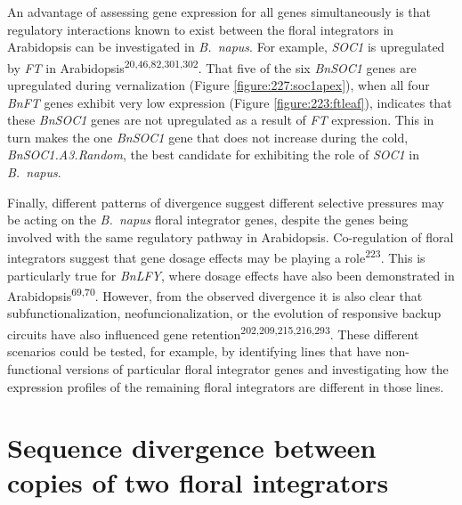 \documentclass[12pt,]{book}
\begin{document}
An advantage of assessing gene expression for all genes simultaneously
is that regulatory interactions known to exist between the floral
integrators in Arabidopsis can be investigated in \emph{B.~napus}. For
example, \emph{SOC1} is upregulated by \emph{FT} in
Arabidopsis\textsuperscript{20,46,82,301,302}. That five of the six
\emph{BnSOC1} genes are upregulated during vernalization (Figure
\ref{figure:227:soc1apex}), when all four \emph{BnFT} genes exhibit very
low expression (Figure \ref{figure:223:ftleaf}), indicates that these
\emph{BnSOC1} genes are not upregulated as a result of \emph{FT}
expression. This in turn makes the one \emph{BnSOC1} gene that does not
increase during the cold, \emph{BnSOC1.A3.Random}, the best candidate
for exhibiting the role of \emph{SOC1} in \emph{B.~napus}.

Finally, different patterns of divergence suggest different selective
pressures may be acting on the \emph{B.~napus} floral integrator genes,
despite the genes being involved with the same regulatory pathway in
Arabidopsis. Co-regulation of floral integrators suggest that gene
dosage effects may be playing a role\textsuperscript{223}. This is
particularly true for \emph{BnLFY}, where dosage effects have also been
demonstrated in Arabidopsis\textsuperscript{69,70}. However, from the
observed divergence it is also clear that subfunctionalization,
neofuncionalization, or the evolution of responsive backup circuits have
also influenced gene retention\textsuperscript{202,209,215,216,293}.
These different scenarios could be tested, for example, by identifying
lines that have non-functional versions of particular floral integrator
genes and investigating how the expression profiles of the remaining
floral integrators are different in those lines.

\section{Sequence divergence between copies of two floral
integrators}\label{section:spring:sequence}
\end{document}
